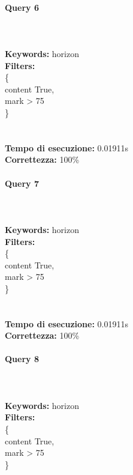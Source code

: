 \documentclass[12pt]{article}
\begin{document}
\paragraph{Query 6} ~ \\ \\

\noindent \textbf{Keywords: } horizon \\
\textbf{Filters: } \\
\indent \{ \\
\indent \indent content True, \\
\indent \indent mark > 75 \\
\indent \} \\\\\\


\noindent
\textbf{Tempo di esecuzione:} 0.01911s \\
\textbf{Correttezza:} 100\% \pagebreak

\paragraph{Query 7} ~ \\ \\

\noindent \textbf{Keywords: } horizon \\
\textbf{Filters: } \\
\indent \{ \\
\indent \indent content True, \\
\indent \indent mark > 75 \\
\indent \} \\\\\\


\noindent
\textbf{Tempo di esecuzione:} 0.01911s \\
\textbf{Correttezza:} 100\% \pagebreak

\paragraph{Query 8} ~ \\ \\

\noindent \textbf{Keywords: } horizon \\
\textbf{Filters: } \\
\indent \{ \\
\indent \indent content True, \\
\indent \indent mark > 75 \\
\indent \} \\\\\\
\end{document}
